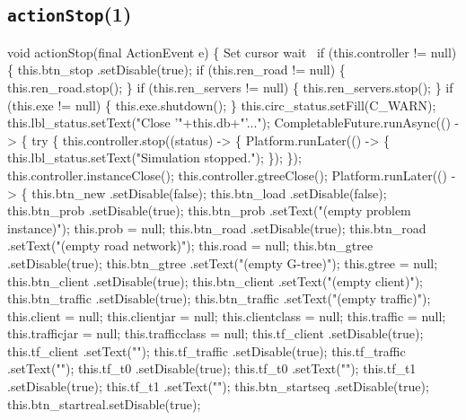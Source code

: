 \subsection{\texttt{actionStop}(1)}
\nwenddocs{}\endmoddef{}
void actionStop(final ActionEvent e) \{
  \LA{}Set cursor wait~{\nwtagstyle{}}\RA{}
  if (this.controller != null) \{
    this.btn_stop     .setDisable(true);
    if (this.ren_road != null) \{
      this.ren_road.stop();
    \}
    if (this.ren_servers != null) \{
      this.ren_servers.stop();
    \}
    if (this.exe != null) \{
      this.exe.shutdown();
    \}
    this.circ_status.setFill(C_WARN);
    this.lbl_status.setText("Close '"+this.db+"'...");
    CompletableFuture.runAsync(() -> \{
      try \{
        this.controller.stop((status) -> \{
          Platform.runLater(() -> \{
            this.lbl_status.setText("Simulation stopped.");
          \});
        \});
        this.controller.instanceClose();
        this.controller.gtreeClose();
        Platform.runLater(() -> \{
          this.btn_new      .setDisable(false);
          this.btn_load     .setDisable(false);
          this.btn_prob     .setDisable(true);
          this.btn_prob     .setText("(empty problem instance)");
          this.prob = null;
          this.btn_road     .setDisable(true);
          this.btn_road     .setText("(empty road network)");
          this.road = null;
          this.btn_gtree    .setDisable(true);
          this.btn_gtree    .setText("(empty G-tree)");
          this.gtree = null;
          this.btn_client   .setDisable(true);
          this.btn_client   .setText("(empty client)");
          this.btn_traffic  .setDisable(true);
          this.btn_traffic  .setText("(empty traffic)");
          this.client = null;
          this.clientjar = null;
          this.clientclass = null;
          this.traffic = null;
          this.trafficjar = null;
          this.trafficclass = null;
          this.tf_client    .setDisable(true);
          this.tf_client    .setText("");
          this.tf_traffic   .setDisable(true);
          this.tf_traffic   .setText("");
          this.tf_t0        .setDisable(true);
          this.tf_t0        .setText("");
          this.tf_t1        .setDisable(true);
          this.tf_t1        .setText("");
          this.btn_startseq .setDisable(true);
          this.btn_startreal.setDisable(true);
